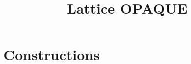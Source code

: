 \documentclass{article}
\author{}
\title{Lattice OPAQUE}
\begin{document}
    \maketitle	
   
%    
    
%    
    

    \section{Constructions}
    \label{sec:constructions}
    


    
    
    
    

    \appendix

 
\end{document}
